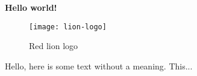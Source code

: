 \documentclass[../main.tex]{subfiles}
\begin{document}
\textbf{Hello world!}

\begin{figure}[bh]
\centering
\texttt{[image: lion-logo]}

\label{fig:img1}
\caption{Red lion logo}
\end{figure}

Hello, here is some text without a meaning.  This... 
\end{document}
